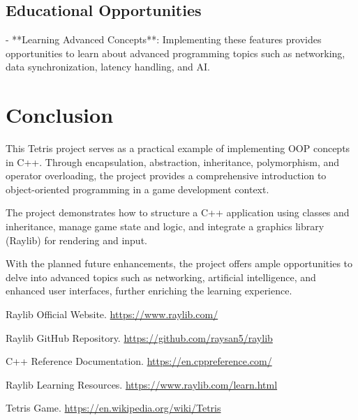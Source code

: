 \documentclass{article}
\begin{document}
\subsection{Educational Opportunities}

- **Learning Advanced Concepts**: Implementing these features provides opportunities to learn about advanced programming topics such as networking, data synchronization, latency handling, and AI.

\section{Conclusion}

This Tetris project serves as a practical example of implementing OOP concepts in C++. Through encapsulation, abstraction, inheritance, polymorphism, and operator overloading, the project provides a comprehensive introduction to object-oriented programming in a game development context.

The project demonstrates how to structure a C++ application using classes and inheritance, manage game state and logic, and integrate a graphics library (Raylib) for rendering and input.

With the planned future enhancements, the project offers ample opportunities to delve into advanced topics such as networking, artificial intelligence, and enhanced user interfaces, further enriching the learning experience.

\newpage

\begin{thebibliography}{9}

Raylib Official Website. \url{https://www.raylib.com/}

Raylib GitHub Repository. \url{https://github.com/raysan5/raylib}

C++ Reference Documentation. \url{https://en.cppreference.com/}

Raylib Learning Resources. \url{https://www.raylib.com/learn.html}

Tetris Game. \url{https://en.wikipedia.org/wiki/Tetris}

\end{thebibliography}
\end{document}
